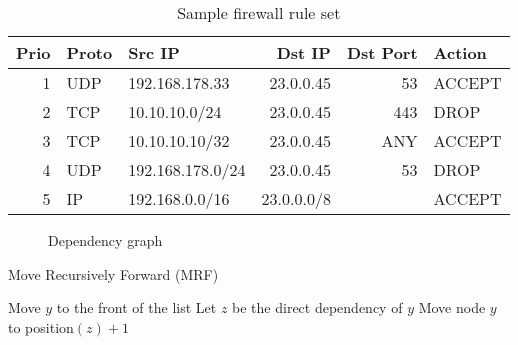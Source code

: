 \begin{table}[t]
  \centering
  \begin{small}
    \renewcommand{\tabcolsep}{2pt}
    \begin{tabular}{r|l|l|r|r|l}
      \textbf{Prio} & \textbf{Proto} & \textbf{Src IP} & \textbf{Dst IP} & \textbf{Dst Port} & \textbf{Action}\\
      \hline
      1 & UDP & 192.168.178.33 & 23.0.0.45 & 53 & ACCEPT\\
      2 & TCP & 10.10.10.0/24 & 23.0.0.45 & 443 & DROP\\
      3 & TCP & 10.10.10.10/32 & 23.0.0.45 & ANY & ACCEPT\\
      4 & UDP & 192.168.178.0/24 & 23.0.0.45 & 53 & DROP\\
      5 & IP & 192.168.0.0/16 & 23.0.0.0/8 &  & ACCEPT\\
    \end{tabular}
  \end{small}%
  \caption{Sample firewall rule set}
  \label{fig:class-sample}
\end{table}

\begin{figure}[t]
  \centering
  \begin{small}
  \end{small}
  \caption{Dependency graph}%
  \label{fig:class-dep}
\end{figure}

\begin{algorithm}
  \caption{Move Recursively Forward (MRF)}
  \label{alg:alg}
  \begin{small}
    \begin{algorithmic}[1]
      \State Move $y$ to the front of the list
      \Else
      \State Let $z$ be the direct dependency of $y$
      \State Move node $y$ to position$(z) + 1$
      \State {}
      \EndIf
      \EndProcedure
    \end{algorithmic}
  \end{small}
\end{algorithm}

